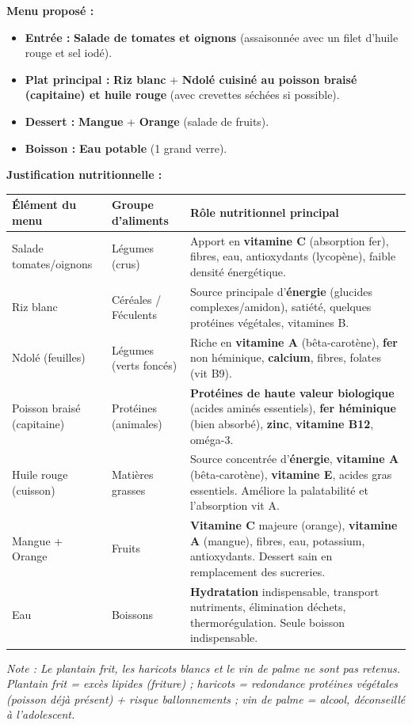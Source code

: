 \documentclass[11pt]{article}
\begin{document}
\begin{corrige}
\textbf{Menu proposé :}
\begin{itemize}
    \item \textbf{Entrée :} \textbf{Salade de tomates et oignons} (assaisonnée avec un filet d'huile rouge et sel iodé).
    \item \textbf{Plat principal :} \textbf{Riz blanc} + \textbf{Ndolé cuisiné au poisson braisé (capitaine) et huile rouge} (avec crevettes séchées si possible).
    \item \textbf{Dessert :} \textbf{Mangue} + \textbf{Orange} (salade de fruits).
    \item \textbf{Boisson :} \textbf{Eau potable} (1 grand verre).
\end{itemize}

\textbf{Justification nutritionnelle :}
\begin{center}
\begin{tabularx}{\linewidth}{|l|l|X|}\hline
\rowcolor{popblueL}
\textbf{Élément du menu} & \textbf{Groupe d'aliments} & \textbf{Rôle nutritionnel principal} \\ \hline
Salade tomates/oignons & Légumes (crus) & Apport en \textbf{vitamine C} (absorption fer), fibres, eau, antioxydants (lycopène), faible densité énergétique. \\ \hline
Riz blanc & Céréales / Féculents & Source principale d'\textbf{énergie} (glucides complexes/amidon), satiété, quelques protéines végétales, vitamines B. \\ \hline
Ndolé (feuilles) & Légumes (verts foncés) & Riche en \textbf{vitamine A} (bêta-carotène), \textbf{fer} non héminique, \textbf{calcium}, fibres, folates (vit B9). \\ \hline
Poisson braisé (capitaine) & Protéines (animales) & \textbf{Protéines de haute valeur biologique} (acides aminés essentiels), \textbf{fer héminique} (bien absorbé), \textbf{zinc}, \textbf{vitamine B12}, oméga-3. \\ \hline
Huile rouge (cuisson) & Matières grasses & Source concentrée d'\textbf{énergie}, \textbf{vitamine A} (bêta-carotène), \textbf{vitamine E}, acides gras essentiels. Améliore la palatabilité et l'absorption vit A. \\ \hline
Mangue + Orange & Fruits & \textbf{Vitamine C} majeure (orange), \textbf{vitamine A} (mangue), fibres, eau, potassium, antioxydants. Dessert sain en remplacement des sucreries. \\ \hline
Eau & Boissons & \textbf{Hydratation} indispensable, transport nutriments, élimination déchets, thermorégulation. Seule boisson indispensable. \\ \hline
\end{tabularx}
\end{center}
\textit{Note : Le plantain frit, les haricots blancs et le vin de palme ne sont pas retenus. Plantain frit = excès lipides (friture) ; haricots = redondance protéines végétales (poisson déjà présent) + risque ballonnements ; vin de palme = alcool, déconseillé à l'adolescent.}
\end{corrige}
\end{document}
